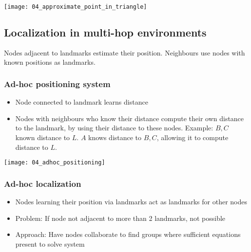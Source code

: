 \texttt{[image: 04\_approximate\_point\_in\_triangle]}

\subsection{Localization in multi-hop environments}

Nodes adjacent to landmarks estimate their position. Neighbours use nodes with
known positions as landmarks.

\subsubsection{Ad-hoc positioning system}

\begin{itemize}
		\item Node connected to landmark learns distance
		\item Nodes with neighbours who know their distance compute their own
				distance to the landmark, by using their distance to these
				nodes. Example: $B, C$ known distance to $L$. $A$ knows
				distance to $B, C$, allowing it to compute distance to $L$.
\end{itemize}

\texttt{[image: 04\_adhoc\_positioning]}

\subsubsection{Ad-hoc localization}

\begin{itemize}
		\item Nodes learning their position via landmarks act as landmarks for other nodes
		\item Problem: If node not adjacent to more than 2 landmarks, not possible
		\item Approach: Have nodes collaborate to find groups where sufficient
				equations present to solve system
\end{itemize}
